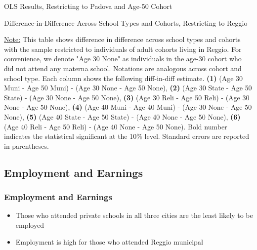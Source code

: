 \documentclass{beamer}
\begin{document}
\begin{frame}
\begin{table}[H]
\begin{center}
	\caption{OLS Results, Restricting to Padova and Age-50 Cohort} \label{table:OLS-V50-E}
	\scalebox{0.5}{
		
	}
	\end{center}
\end{table}
\end{frame}


\begin{frame}
\begin{table}[H] 
\begin{center}
	\caption{Difference-in-Difference Across School Types and Cohorts, Restricting to Reggio} \label{table:EC-Reggio}
	\scalebox{0.5}{
		}
\end{center}
\begin{tiny}
\underline{Note:} This table shows difference in difference across school types and cohorts with the sample restricted to individuals of adult cohorts living in Reggio. For convenience, we denote "Age 30 None" as individuals in the age-30 cohort who did not attend any materna school. Notations are analogous across cohort and school type. Each column shows the following diff-in-diff estimate. \textbf{(1)} (Age 30 Muni - Age 50 Muni) - (Age 30 None - Age 50 None), \textbf{(2)} (Age 30 State - Age 50 State) - (Age 30 None - Age 50 None), \textbf{(3)} (Age 30 Reli - Age 50 Reli) - (Age 30 None - Age 50 None), \textbf{(4)} (Age 40 Muni - Age 40 Muni) - (Age 30 None - Age 50 None),  \textbf{(5)} (Age 40 State - Age 50 State) - (Age 40 None - Age 50 None), \textbf{(6)} (Age 40 Reli - Age 50 Reli) - (Age 40 None - Age 50 None). Bold number indicates the statistical significant at the 10\% level. Standard errors are reported in parentheses. 
\end{tiny}
\end{table}
\end{frame}


\subsection{Employment and Earnings}

\begin{frame} \frametitle{Employment and Earnings}
\begin{itemize}
\item Those who attended private schools in all three cities are the least likely to be employed
\item Employment is high for those who attended Reggio municipal
\end{itemize}
\end{frame}
\end{document}
